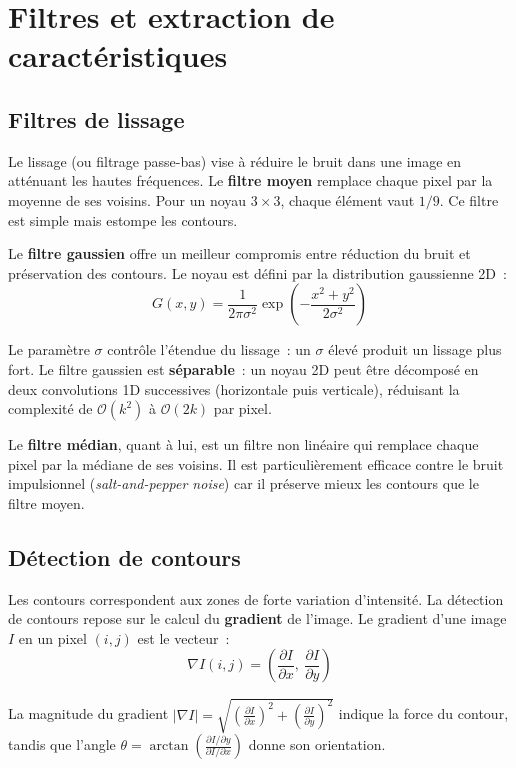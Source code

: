 \documentclass[a4paper,11pt,twoside]{book}
\begin{document}
\chapter{Filtres et extraction de caractéristiques}

\section{Filtres de lissage}

Le lissage (ou filtrage passe-bas) vise à réduire le bruit dans une image en atténuant les hautes fréquences. Le \textbf{filtre moyen} remplace chaque pixel par la moyenne de ses voisins. Pour un noyau $3 \times 3$, chaque élément vaut $1/9$. Ce filtre est simple mais estompe les contours.

Le \textbf{filtre gaussien} offre un meilleur compromis entre réduction du bruit et préservation des contours. Le noyau est défini par la distribution gaussienne 2D~:
\[
G(x, y) = \frac{1}{2\pi\sigma^2} \exp\!\left(-\frac{x^2 + y^2}{2\sigma^2}\right)
\]

Le paramètre $\sigma$ contrôle l'étendue du lissage~: un $\sigma$ élevé produit un lissage plus fort. Le filtre gaussien est \textbf{séparable}~: un noyau 2D peut être décomposé en deux convolutions 1D successives (horizontale puis verticale), réduisant la complexité de $\mathcal{O}(k^2)$ à $\mathcal{O}(2k)$ par pixel.

Le \textbf{filtre médian}, quant à lui, est un filtre non linéaire qui remplace chaque pixel par la médiane de ses voisins. Il est particulièrement efficace contre le bruit impulsionnel (\textit{salt-and-pepper noise}) car il préserve mieux les contours que le filtre moyen.

\section{Détection de contours}

Les contours correspondent aux zones de forte variation d'intensité. La détection de contours repose sur le calcul du \textbf{gradient} de l'image. Le gradient d'une image $I$ en un pixel $(i, j)$ est le vecteur~:
\[
\nabla I(i,j) = \left(\frac{\partial I}{\partial x},\ \frac{\partial I}{\partial y}\right)
\]

La magnitude du gradient $|\nabla I| = \sqrt{\left(\frac{\partial I}{\partial x}\right)^2 + \left(\frac{\partial I}{\partial y}\right)^2}$ indique la force du contour, tandis que l'angle $\theta = \arctan\!\left(\frac{\partial I / \partial y}{\partial I / \partial x}\right)$ donne son orientation.
\end{document}
